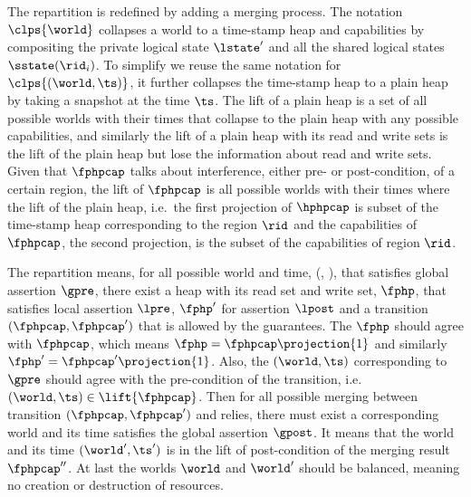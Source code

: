 The repartition is redefined by adding a merging process.
The notation \( \clps{\world} \) collapses a world to a time-stamp heap and capabilities by compositing the private logical state \( \lstate' \) and all the shared logical states \( \sstate(\rid_{i}) \).
To simplify we reuse the same notation for \( \clps{( \world, \ts) } \), it further collapses the time-stamp heap to a plain heap by taking a snapshot at the time \( \ts \).
The lift of a plain heap is a set of all possible worlds with their times that collapse to the plain heap with any possible capabilities, and similarly the lift of a plain heap with its read and write sets is the lift of the plain heap but lose the information about read and write sets.
Given that \( \fphpcap \) talks about interference, either pre- or post-condition, of a certain region, the lift of \( \fphpcap \) is all possible worlds with their times where the lift of the plain heap, i.e.\ the first projection of \( \hphpcap \) is subset of the time-stamp heap corresponding to the region \( \rid \) and the capabilities of \( \fphpcap \), the second projection, is the subset of the capabilities of region \( \rid \).

The repartition means, for all possible world and time, (\world, \ts), that satisfies global assertion \( \gpre \), there exist a heap with its read set and write set, \( \fphp \), that satisfies local assertion \( \lpre \), \( \fphp' \) for assertion \( \lpost \) and a transition \( (\fphpcap, \fphpcap' ) \) that is allowed by the guarantees.
The \( \fphp \) should agree with \( \fphpcap \), which means \( \fphp = \fphpcap\projection{1} \) and similarly \( \fphp' = \fphpcap'\projection{1} \).
Also, the \( (\world, \ts) \) corresponding to \( \gpre \) should agree with the pre-condition of the transition, i.e.\ \( (\world, \ts) \in \lift{\fphpcap} \).
Then for all possible merging between transition \( (\fphpcap, \fphpcap' ) \) and relies, there must exist a corresponding world and its time satisfies the global assertion \( \gpost \).
It means that the world and its time \( (\world', \ts') \) is in the lift of post-condition of the merging result \( \fphpcap'' \).
At last the worlds \( \world \) and \( \world' \) should be balanced, meaning no creation or destruction of resources.


